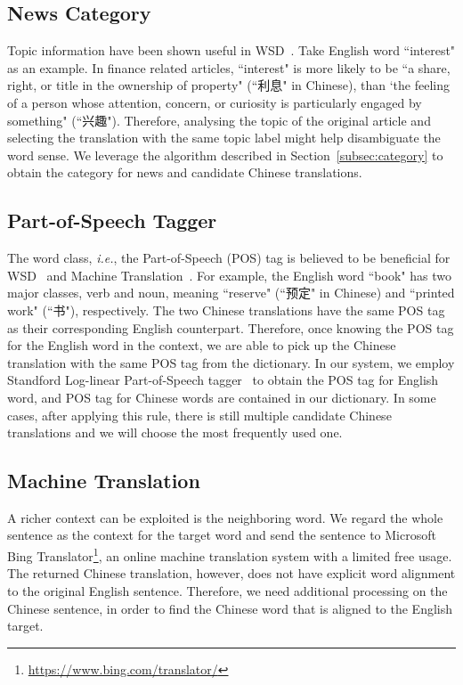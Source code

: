 \begin{CJK}{UTF8}{gbsn}
\subsection{News Category}
Topic information have been shown useful in WSD~\cite{Boyd-Graber2007}. Take English word  ``interest" as an example. In finance related articles, ``interest" is more likely to be ``a share, right, or title in the ownership of property" (``利息" in Chinese), than `the feeling of a person whose attention, concern, or curiosity is particularly engaged by something" (``兴趣").  Therefore, analysing the topic of the original article and selecting the translation with the same topic label might help disambiguate the word sense. We leverage the algorithm described in Section~\ref{subsec:category} to obtain the category for news and candidate Chinese translations. 


\subsection{Part-of-Speech Tagger}
The word class, {\it i.e.}, the Part-of-Speech (POS) tag is believed to be beneficial for WSD~\cite{Wilks1998} and Machine Translation~\cite{Toutanova2002,Ueffing2003}.
For example, the English word ``book" has two major classes, verb and noun, meaning ``reserve" (``预定" in Chinese) and ``printed work" (``书"), respectively. The two  Chinese translations have the same POS tag as their corresponding English counterpart.
Therefore, once knowing the POS tag for the English word in the context, we are able to pick up the Chinese translation with the same POS tag from the dictionary.
In our system, we employ Standford Log-linear Part-of-Speech tagger~\cite{Toutanova2003} to obtain the POS tag for English word, and POS tag for Chinese words are contained in our dictionary.
 In some cases, after applying this rule, there is still multiple candidate Chinese translations and we will choose the most frequently used one. 


\subsection{Machine Translation}
A richer context can be exploited is the neighboring word. We regard the whole sentence as the context for the target word and send the sentence to Microsoft Bing Translator\footnote{\url{https://www.bing.com/translator/}}, an online machine translation system with a limited free usage. The returned Chinese translation, however, does not have explicit word alignment to the original English sentence. Therefore, we need additional processing on the Chinese sentence, in order to find the Chinese word that is aligned to the English target.



\end{CJK}
